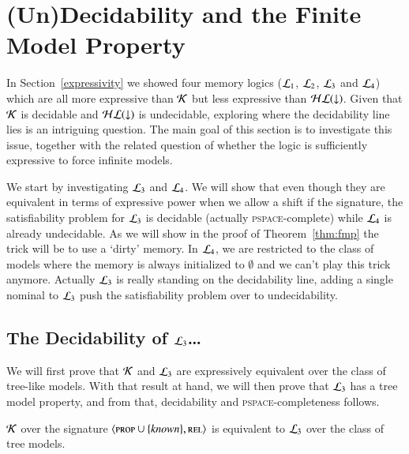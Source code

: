 \section{(Un)Decidability and the Finite Model Property}

In Section~\ref{expressivity} we showed four memory logics
($\mathcal{L}_1$, $\mathcal{L}_2$, $\mathcal{L}_3$ and $\mathcal{L}_4$) which are all more
expressive than $\mathcal{K}$ but less expressive than $\mathcal{HL}({\downarrow})$. Given
that $\mathcal{K}$ is decidable and $\mathcal{HL}({\downarrow})$ is undecidable, exploring
where the decidability line lies is an intriguing question.  The
main goal of this section is to investigate this issue, together
with the related question of whether the logic is sufficiently
expressive to force infinite models.

We start by investigating $\mathcal{L}_3$ and $\mathcal{L}_4$. We will show
that even though they are equivalent in terms of expressive power
when we allow a shift if the signature, the satisfiability problem
for $\mathcal{L}_3$ is decidable (actually \textsc{pspace}-complete) while
$\mathcal{L}_4$ is already undecidable. As we will show in the proof of
Theorem~\ref{thm:fmp} the trick will be to use a `dirty' memory. In
$\mathcal{L}_4$, we are restricted to the class of models where the
memory is always initialized to $\emptyset$ and we can't play this
trick anymore.  Actually $\mathcal{L}_3$ is really standing on the
decidability line, adding a single nominal to $\mathcal{L}_3$ push the
satisfiability problem over to undecidability.

\subsection{The Decidability of $\mathcal{L}_3$\ldots}

We will first prove that $\mathcal{K}$ and $\mathcal{L}_3$ are expressively
equivalent over the class of tree-like models.  With that result at
hand, we will then prove that $\mathcal{L}_3$ has a tree model property,
and from that, decidability and \textsc{pspace}-completeness
follows.

\begin{thm}\label{prop:sat-preserv-tree}
$\mathcal{K}$  over the signature $\langle \textsc{prop} \cup \{\mathit{known}\},\textsc{rel} \rangle$
is equivalent to $\mathcal{L}_3$ over the class of tree models.
\end{thm}

